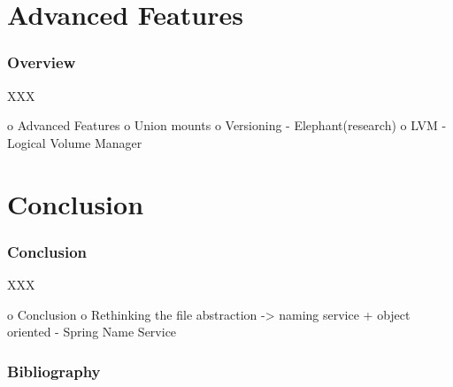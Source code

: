 %
%

\section{Advanced Features}


\begin{frame}
  \frametitle{Overview}

  XXX
\end{frame}

o Advanced Features
 o Union mounts
 o Versioning
   - Elephant(research)
 o LVM - Logical Volume Manager

%
%

\section{Conclusion}


\begin{frame}
  \frametitle{Conclusion}

  XXX
\end{frame}

o Conclusion
 o Rethinking the file abstraction -> naming service + object oriented
   - Spring Name Service

%
%

\begin{frame}
  \frametitle{Bibliography}

  
  
\end{frame}


